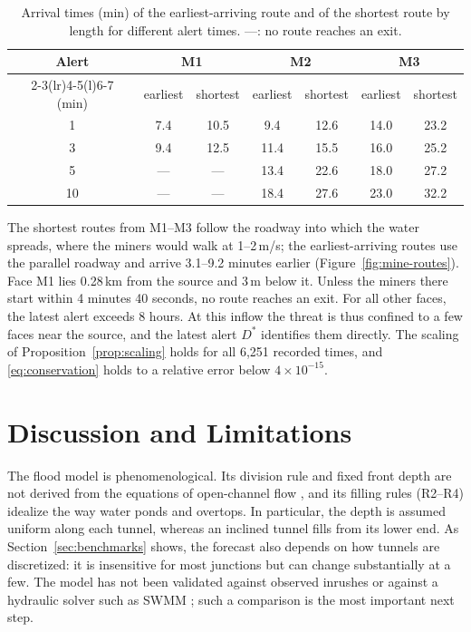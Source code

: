\documentclass[11pt,a4paper]{article}
\theoremstyle{plain}
\theoremstyle{definition}
\theoremstyle{remark}
\begin{document}
\begin{table}[htbp]
  \centering\small
  \begin{tabular}{@{}c cc cc cc@{}}
    \toprule
    Alert & \multicolumn{2}{c}{M1} & \multicolumn{2}{c}{M2} & \multicolumn{2}{c}{M3} \\
    \cmidrule(lr){2-3}\cmidrule(lr){4-5}\cmidrule(l){6-7}
    (min) & earliest & shortest & earliest & shortest & earliest & shortest \\
    \midrule
    1  & 7.4 & 10.5 & 9.4  & 12.6 & 14.0 & 23.2 \\
    3  & 9.4 & 12.5 & 11.4 & 15.5 & 16.0 & 25.2 \\
    5  & --- & ---  & 13.4 & 22.6 & 18.0 & 27.2 \\
    10 & --- & ---  & 18.4 & 27.6 & 23.0 & 32.2 \\
    \bottomrule
  \end{tabular}
  \caption{Arrival times (min) of the earliest-arriving route and of the shortest route by length for different alert times. ---: no route reaches an exit.}
  \label{tab:mine-alert}
\end{table}


The shortest routes from M1--M3 follow the roadway into which the water spreads, where the miners would walk at 1--2\,m/s; the earliest-arriving routes use the parallel roadway and arrive 3.1--9.2 minutes earlier (Figure~\ref{fig:mine-routes}). Face M1 lies 0.28\,km from the source and 3\,m below it. Unless the miners there start within 4 minutes 40 seconds, no route reaches an exit. For all other faces, the latest alert exceeds 8 hours. At this inflow the threat is thus confined to a few faces near the source, and the latest alert $D^*$ identifies them directly. The scaling of Proposition~\ref{prop:scaling} holds for all 6{,}251 recorded times, and \eqref{eq:conservation} holds to a relative error below $4\times10^{-15}$.

\section{Discussion and Limitations}\label{sec:discussion}

The flood model is phenomenological. Its division rule and fixed front depth are not derived from the equations of open-channel flow \cite{chow}, and its filling rules (R2--R4) idealize the way water ponds and overtops. In particular, the depth is assumed uniform along each tunnel, whereas an inclined tunnel fills from its lower end. As Section~\ref{sec:benchmarks} shows, the forecast also depends on how tunnels are discretized: it is insensitive for most junctions but can change substantially at a few. The model has not been validated against observed inrushes or against a hydraulic solver such as SWMM \cite{swmm}; such a comparison is the most important next step.
\end{document}
